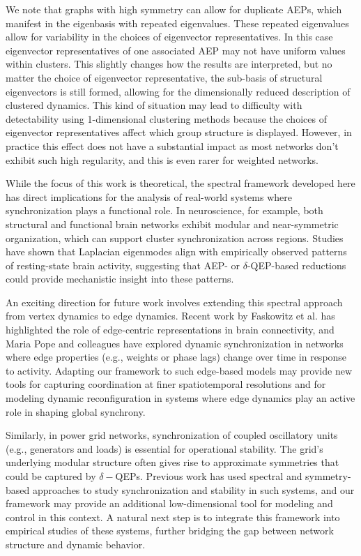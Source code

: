 \documentclass[%
 aip,
 amsmath,amssymb,
preprint,
reprint, onecolumn %
]{revtex4-1}
\begin{document}
We note that graphs with high symmetry can allow for duplicate AEPs, which manifest in the eigenbasis with repeated eigenvalues. These repeated eigenvalues allow for variability in the choices of eigenvector representatives. In this case eigenvector representatives of one associated AEP may not have uniform values within clusters. This slightly changes how the results are interpreted, but no matter the choice of eigenvector representative, the sub-basis of structural eigenvectors is still formed, allowing for the dimensionally reduced description of clustered dynamics. 
This kind of situation may lead to difficulty with detectability using 1-dimensional clustering methods because the choices of eigenvector representatives affect which group structure is displayed. However, in practice this effect does not have a substantial impact as most networks don't exhibit such high regularity, and this is even rarer for weighted networks.

While the focus of this work is theoretical, the spectral framework developed here has direct implications for the analysis of real-world systems where synchronization plays a functional role. In neuroscience, for example, both structural and functional brain networks exhibit modular and near-symmetric organization, which can support cluster synchronization across regions. Studies have shown that Laplacian eigenmodes align with empirically observed patterns of resting-state brain activity,\cite{atasoy_human_2016, deco_emerging_2011, cabral2011role} suggesting that AEP- or $\delta$-QEP-based reductions could provide mechanistic insight into these patterns.

An exciting direction for future work involves extending this spectral approach from vertex dynamics to edge dynamics. Recent work by Faskowitz et al. has highlighted the role of edge-centric representations in brain connectivity,\cite{faskowitz2020edge} and Maria Pope and colleagues have explored dynamic synchronization in networks where edge properties (e.g., weights or phase lags) change over time in response to activity.\cite{pope2023co} Adapting our framework to such edge-based models may provide new tools for capturing coordination at finer spatiotemporal resolutions and for modeling dynamic reconfiguration in systems where edge dynamics play an active role in shaping global synchrony.

Similarly, in power grid networks, synchronization of coupled oscillatory units (e.g., generators and loads) is essential for operational stability. The grid’s underlying modular structure often gives rise to approximate symmetries that could be captured by $\delta-$QEPs.\cite{Chow_Power_Grid_Coherency} Previous work has used spectral and symmetry-based approaches to study synchronization and stability in such systems,\cite{dorfler2012synchronization, motter2013spontaneous, nishikawa2015comparative} and our framework may provide an additional low-dimensional tool for modeling and control in this context. A natural next step is to integrate this framework into empirical studies of these systems, further bridging the gap between network structure and dynamic behavior.
\end{document}
